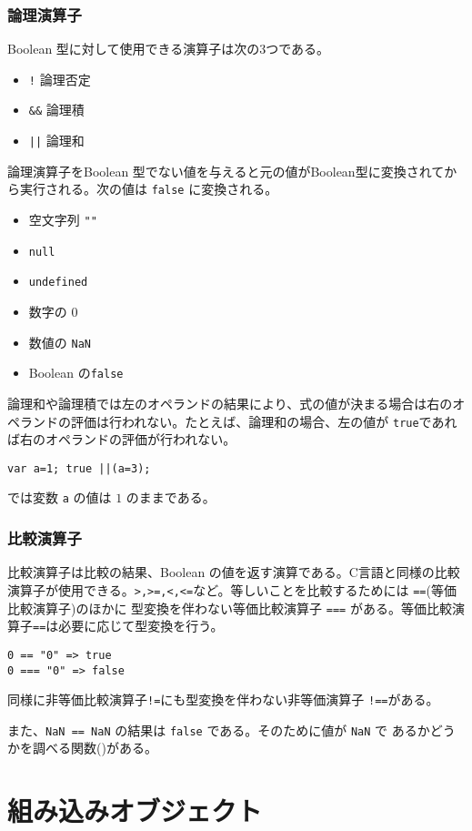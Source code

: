 \subsubsection{論理演算子}
Boolean 型に対して使用できる演算子は次の3つである。
\begin{itemize}
 \item \Verb+!+ 論理否定
 \item \Verb+&&+ 論理積
 \item \Verb+||+ 論理和
\end{itemize}
論理演算子をBoolean 型でない値を与えると元の値がBoolean型に変換されてか
ら実行される。次の値は \Verb+false+ に変換される。
\begin{itemize}
 \item 空文字列 \Verb+""+
 \item \Verb+null+
 \item \Verb+undefined+
 \item 数字の $0$
 \item 数値の \Verb+NaN+
 \item Boolean の\Verb+false+
\end{itemize}
論理和や論理積では左のオペランドの結果により、式の値が決まる場合は右のオ
ペランドの評価は行われない。たとえば、論理和の場合、左の値が
\Verb+true+であれば右のオペランドの評価が行われない。
\begin{Verbatim}
var a=1; true ||(a=3); 
\end{Verbatim}
では変数 \Verb+a+ の値は $1$ のままである。
\subsubsection{比較演算子}
比較演算子は比較の結果、Boolean の値を返す演算である。C言語と同様の比較
演算子が使用できる。\texttt{>,>=,<,<=}など。等しいことを比較するためには
\Verb+==+(等価比較演算子)のほかに 型変換を伴わない等価比較演算子
\Verb+===+ がある。等価比較演算子\texttt{==}は必要に応じて型変換を行う。
\begin{Verbatim}
0 == "0" => true
0 === "0" => false
\end{Verbatim}
同様に非等価比較演算子\texttt{!=}にも型変換を伴わない非等価演算子
\texttt{!==}がある。

また、\Verb+NaN == NaN+ の結果は \Verb+false+ である。そのために値が \Verb+NaN+ で
あるかどうかを調べる関数()がある。
\section{組み込みオブジェクト}
